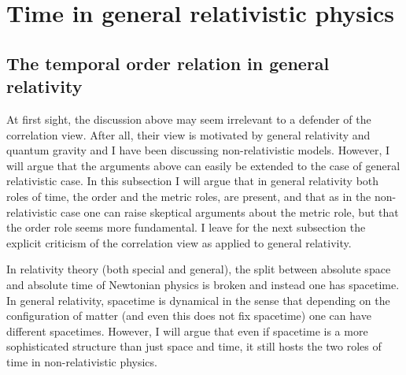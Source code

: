 \documentclass[12 pt]{article}
\begin{document}
\section{Time in general relativistic physics} \label{sect_relativistic}

\subsection{The temporal order relation in general relativity}

At first sight, the discussion above may seem irrelevant to a defender of the correlation view. After all, their view is motivated by general relativity and quantum gravity and I have been discussing non-relativistic models. However, I will argue that the arguments above can easily be extended to the case of general relativistic case. In this subsection I will argue that in general relativity both roles of time, the order and the metric roles, are present, and that as in the non-relativistic case one can raise skeptical arguments about the metric role, but that the order role seems more fundamental. I leave for the next subsection the explicit criticism of the correlation view as applied to general relativity.

In relativity theory (both special and general), the split between absolute space and absolute time of Newtonian physics is broken and instead one has spacetime. In general relativity, spacetime is dynamical in the sense that depending on the configuration of matter (and even this does not fix spacetime) one can have different spacetimes. However, I will argue that even if spacetime is a more sophisticated structure than just space and time, it still hosts the two roles of time in non-relativistic physics.
\end{document}
